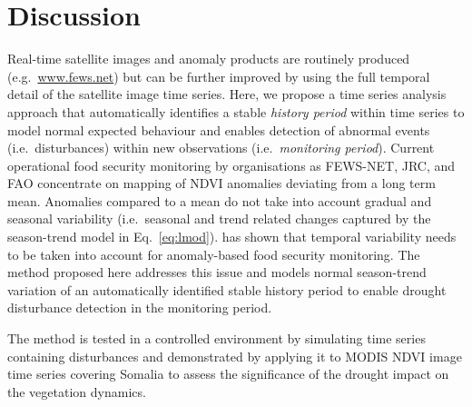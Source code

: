 \documentclass[authoryear,preprint,review,10pt]{elsarticle}
\begin{document}
\section{Discussion} \label{sec:Disc}

Real-time satellite images and anomaly products are routinely produced (e.g.\ \url{www.fews.net}) but can be further improved by using the full temporal detail of the satellite image time series. Here, we propose a time series analysis approach that automatically identifies a stable \emph{history period} within time series to model normal expected behaviour and enables detection of abnormal events (i.e.\ disturbances) within new observations (i.e.\ \emph{monitoring period}). Current operational food security monitoring by organisations as FEWS-NET, JRC, and FAO concentrate on mapping of NDVI anomalies deviating from a long term mean. Anomalies compared to a mean do not take into account gradual and seasonal variability (i.e.\ seasonal and trend related changes captured by the season-trend model in Eq.~\ref{eq:lmod}). \citet{Vrieling:2011da} has shown that temporal variability needs to be taken into account for anomaly-based food security monitoring. The method proposed here addresses this issue and models normal season-trend variation of an automatically identified stable history period to enable drought disturbance detection in the monitoring period.

The method is tested in a controlled environment by simulating time series containing disturbances and demonstrated by applying it to MODIS NDVI image time series covering Somalia to assess the significance of the drought impact on the vegetation dynamics. 
\end{document}
